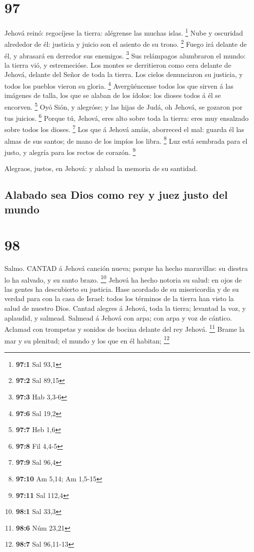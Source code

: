 \hypertarget{section-96}{%
\section{97}\label{section-96}}

 Jehová reinó: regocíjese la tierra: alégrense las muchas
islas. \footnote{\textbf{97:1} Sal 93,1}  Nube y oscuridad
alrededor de él: justicia y juicio son el asiento de su trono.
\footnote{\textbf{97:2} Sal 89,15}  Fuego irá delante de él,
y abrasará en derredor sus enemigos. \footnote{\textbf{97:3} Hab 3,3-6}
 Sus relámpagos alumbraron el mundo: la tierra vió, y
estremecióse.  Los montes se derritieron como cera delante
de Jehová, delante del Señor de toda la tierra.  Los cielos
denunciaron su justicia, y todos los pueblos vieron su gloria.
\footnote{\textbf{97:6} Sal 19,2}  Avergüéncense todos los
que sirven á las imágenes de talla, los que se alaban de los ídolos: los
dioses todos á él se encorven. \footnote{\textbf{97:7} Heb 1,6}
 Oyó Sión, y alegróse; y las hijas de Judá, oh Jehová, se
gozaron por tus juicios. \footnote{\textbf{97:8} Fil 4,4-5} 
Porque tú, Jehová, eres alto sobre toda la tierra: eres muy ensalzado
sobre todos los dioses. \footnote{\textbf{97:9} Sal 96,4} 
Los que á Jehová amáis, aborreced el mal: guarda él las almas de sus
santos; de mano de los impíos los libra. \footnote{\textbf{97:10} Am
  5,14; Am 1,5-15}  Luz está sembrada para el justo, y
alegría para los rectos de corazón. \footnote{\textbf{97:11} Sal 112,4}

 Alegraos, justos, en Jehová: y alabad la memoria de su
santidad.

\hypertarget{alabado-sea-dios-como-rey-y-juez-justo-del-mundo}{%
\subsection{Alabado sea Dios como rey y juez justo del
mundo}\label{alabado-sea-dios-como-rey-y-juez-justo-del-mundo}}

\hypertarget{section-97}{%
\section{98}\label{section-97}}

 Salmo. CANTAD á Jehová canción nueva; porque ha hecho
maravillas: su diestra lo ha salvado, y su santo brazo. \footnote{\textbf{98:1}
  Sal 33,3}  Jehová ha hecho notoria su salud: en ojos de
las gentes ha descubierto su justicia.  Hase acordado de su
misericordia y de su verdad para con la casa de Israel: todos los
términos de la tierra han visto la salud de nuestro Dios. 
Cantad alegres á Jehová, toda la tierra; levantad la voz, y aplaudid, y
salmead.  Salmead á Jehová con arpa; con arpa y voz de
cántico.  Aclamad con trompetas y sonidos de bocina delante
del rey Jehová. \footnote{\textbf{98:6} Núm 23,21}  Brame la
mar y su plenitud; el mundo y los que en él habitan; \footnote{\textbf{98:7}
  Sal 96,11-13}


